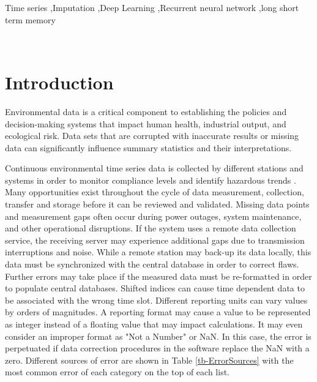 \documentclass[preprint,12pt,authoryear]{elsarticle}
\begin{document}
\begin{linenumbers}
\begin{frontmatter}
\begin{abstract}
\end{abstract}

\begin{keyword}
Time series \sep Imputation \sep Deep Learning \sep Recurrent neural network \sep  long short term memory 
\end{keyword}

\end{frontmatter}
 
\section{Introduction}
Environmental data is a critical component to establishing the policies and decision-making systems that impact human health, industrial output, and ecological risk. Data sets that are corrupted with inaccurate results or missing data can significantly influence summary statistics and their interpretations. 

Continuous environmental time series data is collected by different stations and systems in order to monitor compliance levels and identify hazardous trends \citep{Freeman2017a}.  Many opportunities exist throughout the cycle of data measurement, collection, transfer and storage before it can be reviewed and validated. Missing data points and measurement gaps often occur during power outages, system maintenance, and other operational disruptions. If the system uses a remote data collection service, the receiving server may experience additional gaps due to transmission interruptions and noise. While a remote station may back-up its data locally, this data must be synchronized with the central database in order to correct flaws. Further errors may take place if the measured data must be re-formatted in order to populate central databases. Shifted indices can cause time dependent data to be associated with the wrong time slot. Different reporting units can vary values by orders of magnitudes. A reporting format may cause a value to be represented as integer instead of a floating value that may impact calculations. It may even consider an improper format as "Not a Number" or NaN. In this case, the error is perpetuated if data correction procedures in the software replace the NaN with a zero. Different sources of error are shown in Table \ref{tb-ErrorSources} with the most common error of each category on the top of each list.  


\end{linenumbers}
\end{document}
